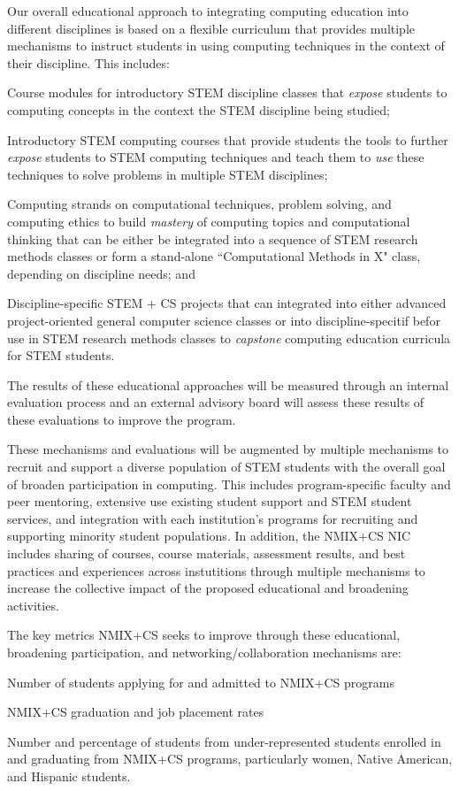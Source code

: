 Our overall educational approach to integrating computing education into different disciplines is based on a flexible curriculum that provides multiple mechanisms to instruct students in using computing techniques in the context of their discipline. This includes:
\begin{tightitemize}
\item Course modules for introductory STEM discipline classes that \emph{expose} students to computing concepts
  in the context the STEM discipline being studied;
\item Introductory STEM computing courses that provide students the tools to further \emph{expose} students to STEM computing techniques and teach them to \emph{use} these techniques to solve problems in multiple STEM disciplines;
\item Computing strands on computational techniques, problem solving, and computing ethics  to build \emph{mastery} of computing topics and computational thinking that can be either be integrated into a sequence of STEM research methods classes or form a stand-alone ``Computational Methods in X" class, depending on discipline needs; and
\item Discipline-specific STEM + CS projects that can integrated into either advanced project-oriented general computer science classes or into discipline-specitif befor use in STEM research methods classes to \emph{capstone} computing education
  curricula for STEM students.
\end{tightitemize}
The results of these educational approaches will be measured through an internal evaluation process and an external advisory board will assess these results of these evaluations to improve the program.

These mechanisms and evaluations will be augmented by multiple mechanisms to recruit and support a diverse population of STEM students with the overall goal of broaden participation in computing. This includes program-specific faculty and peer mentoring, extensive use existing student support and STEM student services, and integration with each institution's programs for recruiting and supporting minority student populations. In addition, the NMIX+CS NIC includes sharing of courses,
course materials, assessment results, and best practices and experiences across instutitions through multiple mechanisms to increase the collective impact of the proposed educational and broadening activities.

The key metrics NMIX+CS seeks to improve through these educational, broadening participation, and networking/collaboration mechanisms are:
\begin{tightitemize}
\item Number of students applying for and admitted to NMIX+CS programs
\item NMIX+CS graduation and job placement rates
\item Number and percentage of students from under-represented students enrolled in and 
  graduating from NMIX+CS programs, particularly women, Native American, and Hispanic students.
\end{tightitemize}

